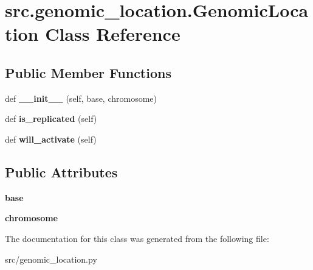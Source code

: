 \hypertarget{classsrc_1_1genomic__location_1_1GenomicLocation}{}\section{src.\+genomic\+\_\+location.\+Genomic\+Location Class Reference}
\label{classsrc_1_1genomic__location_1_1GenomicLocation}
\subsection*{Public Member Functions}
\begin{DoxyCompactItemize}
\item 
\mbox{\label{classsrc_1_1genomic__location_1_1GenomicLocation_a6d9737472eaaef281554ddeb634fd1fc}} 
def {\bfseries \+\_\+\+\_\+init\+\_\+\+\_\+} (self, base, chromosome)
\item 
\mbox{\label{classsrc_1_1genomic__location_1_1GenomicLocation_a19b4782c98fa6198eab045521d28ef60}} 
def {\bfseries is\+\_\+replicated} (self)
\item 
\mbox{\label{classsrc_1_1genomic__location_1_1GenomicLocation_abc3881f71488d1778f5600d62956399d}} 
def {\bfseries will\+\_\+activate} (self)
\end{DoxyCompactItemize}
\subsection*{Public Attributes}
\begin{DoxyCompactItemize}
\item 
\mbox{\label{classsrc_1_1genomic__location_1_1GenomicLocation_a0911dbe38e04f1f4cd1f2fa53a8f4374}} 
{\bfseries base}
\item 
\mbox{\label{classsrc_1_1genomic__location_1_1GenomicLocation_a8ecc294c5efeb571a82a613e1dcb1b60}} 
{\bfseries chromosome}
\end{DoxyCompactItemize}


The documentation for this class was generated from the following file\+:\begin{DoxyCompactItemize}
\item 
src/genomic\+\_\+location.\+py\end{DoxyCompactItemize}
